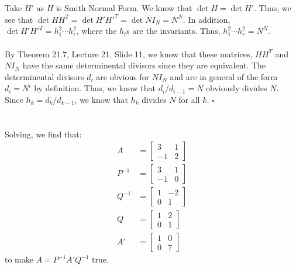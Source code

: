 \documentclass[letterpaper]{article}
\newcommand*{\QED}{\hfill\ensuremath{\square}}%
\begin{document}
\section{}
\label{sec:Question5}

Take $ H' $ as $ H $ is Smith Normal Form.
We know that $ \det{H} = \det{H'} $.
Thus, we see that $ \det{HH^T} = \det{H'H'^T} = \det{N I_N} = N^N $.
In addition, $ \det{H'H'^T} = h_1^2 \cdots h_r^2 $, where the $ h_i $s are the invariants.
Thus, $ h_1^2 \cdots h_r^2 = N^N $.
\\ \\
By Theorem 21.7, Lecture 21, Slide 11, we know that these matrices, $ HH^{T} $ and $ N I_N $ have the same determinental divisors since they are equivalent.
The determinental divisors  $ d_i $ are obvious for $ N I_N $ and are in general of the form $ d_i = N^i $ by definition.
Thus, we know that $ d_i / d_{i - 1} = N $ obviously divides $ N $.
Since $ h_k = d_k / d_{k - 1} $, we know that $ h_k $ divides $ N $ for all $ k $.
\QED{}

\section{}
\label{sec:Question6}

Solving, we find that:
\begin{align}
    A &= \begin{bmatrix} 3 & 1 \\ -1 & 2 \end{bmatrix} \\
    P^{-1} &= \begin{bmatrix} 3 & 1 \\ -1 & 0 \end{bmatrix} \\
    Q^{-1} &= \begin{bmatrix} 1 & -2 \\ 0 & 1 \end{bmatrix} \\
    Q &= \begin{bmatrix} 1 & 2 \\ 0 & 1 \end{bmatrix} \\
    A' &= \begin{bmatrix} 1 & 0 \\ 0 & 7 \end{bmatrix}
\end{align}
to make $ A = P^{-1} A' Q^{-1} $ true.
\end{document}
